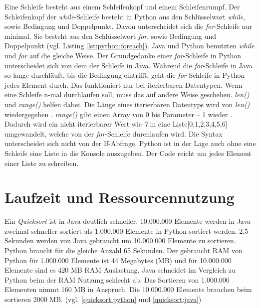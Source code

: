 Eine Schleife besteht aus einem Schleifenkopf und einem Schleifenrumpf. Der Schleifenkopf der \textit{while}-Schleife besteht in Python aus den Schlüsselwort \textit{while}, sowie Bedingung und Doppelpunkt. Davon unterscheidet sich die \textit{for}-Schleife nur minimal. Sie besteht aus den Schlüsselwort \textit{for}, sowie Bedingung und Doppelpunkt (vgl. Listing \ref{lst:python:foreach}). Java und Python benutzten \textit{while} und \textit{for} auf die gleiche Weise. Der Grundgedanke einer \textit{for}-Schleife in Python unterscheidet sich von dem der Schleife in Java. Während die \textit{for}-Schleife in Java so lange durchläuft, bis die Bedingung eintrifft, geht die \textit{for}-Schleife in Python jedes Element durch. Das funktioniert nur bei iterierbaren Datentypen. Wenn eine Schleife n-mal durchlaufen soll, muss das auf andere Weise geschehen. \textit{len()} und \textit{range()} helfen dabei. Die Länge eines iterierbaren Datentyps wird von \textit{len()} wiedergegeben \cite{w3school_len}. \textit{range()} gibt einen Array von 0 bis Parameter – 1 wieder \cite{w3school_range}. Dadurch wird ein nicht iterierbarer Wert wie \textit{7} in eine Liste[0,1,2,3,4,5,6] umgewandelt, welche von der \textit{for}-Schleife durchlaufen wird. Die Syntax unterscheidet sich nicht von der If-Abfrage. 
Python ist in der Lage auch ohne eine Schleife eine Liste in die Konsole auszugeben.  Der Code  reicht um jedes Element einer Liste zu schreiben.\cite{Python3:Buch}\cite{Louis:2010}
\par
\section{Laufzeit und Ressourcennutzung}
Ein \textit{Quicksort} ist in Java deutlich schneller. 10.000.000 Elemente werden in Java zweimal schneller sortiert als 1.000.000 Elemente in Python sortiert werden. 2,5 Sekunden werden von Java gebraucht um 10.000.000 Elemente zu sortieren. Python braucht für die gleiche Anzahl 65 Sekunden. Der gebraucht RAM von Python für 1.000.000 Elemente ist 44 Megabytes (MB) und für 10.000.000 Elemente sind es 420 MB RAM Auslastung. Java schneidet im Vergleich zu Python beim der RAM Nutzung schlecht ab. Das Sortieren von 1.000.000 Elementen nimmt 160 MB in Anspruch. Die 10.000.000 Elemente brauchen beim sortieren 2000 MB. (vgl. \ref{quicksort:python} und \ref{quicksort:java})
